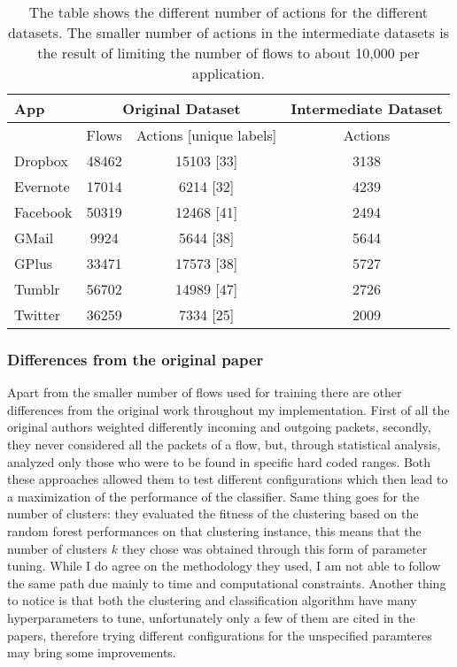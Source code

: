 \begin{table}[!h]
\centering
\begin{tabular}{|l|c|c|c|}
\hline
App      & \multicolumn{2}{c|}{Original Dataset} & Intermediate Dataset \\ \hline
         & Flows    & Actions [unique labels]    & Actions              \\ \hline
Dropbox  & 48462    & 15103 [33]                 & 3138                 \\ \hline
Evernote & 17014    & 6214 [32]                  & 4239                 \\ \hline
Facebook & 50319    & 12468 [41]                 & 2494                 \\ \hline
GMail    & 9924     & 5644 [38]                  & 5644                 \\ \hline
GPlus    & 33471    & 17573 [38]                 & 5727                 \\ \hline
Tumblr   & 56702    & 14989 [47]                 & 2726                 \\ \hline
Twitter  & 36259    & 7334 [25]                  & 2009                 \\ \hline
\end{tabular}
\caption{\small{The table shows the different number of actions for the different datasets. The smaller number of actions in the intermediate datasets is the result of limiting the number of flows to about 10,000 per application.}}
\label{tab:datasetdata}
\end{table}


\subsubsection{Differences from the original paper}
Apart from the smaller number of flows used for training there are other differences from the original work throughout my implementation. First of all the original authors weighted differently incoming and outgoing packets, secondly, they never considered all the packets of a flow, but, through statistical analysis, analyzed only those who were to be found in specific hard coded ranges. Both these approaches allowed them to test different configurations which then lead to a maximization of the performance of the classifier. Same thing goes for the number of clusters: they evaluated the fitness of the clustering based on the random forest performances on that clustering instance, this means that the number of clusters $k$ they chose was obtained through this form of parameter tuning. While I do agree on the methodology they used, I am not able to follow the same path due mainly to time and computational constraints. Another thing to notice is that both the clustering and classification algorithm have many hyperparameters to tune, unfortunately only a few of them are cited in the papers, therefore trying different configurations for the unspecified paramteres may bring some improvements.

